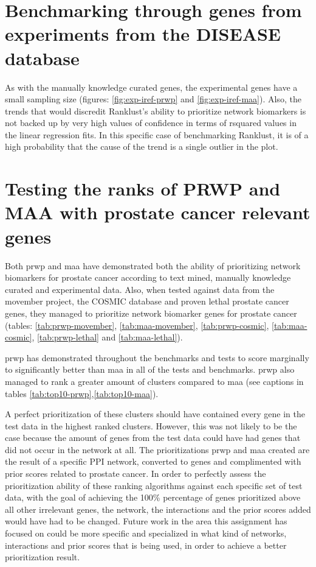 \section{Benchmarking through genes from experiments from the DISEASE database}
As with the manually knowledge curated genes, the experimental genes have
a small sampling size (figures: \ref{fig:exp-iref-prwp} and
\ref{fig:exp-iref-maa}). Also, the trends that would discredit Ranklust's
ability to prioritize network biomarkers is not backed up by very high values of
confidence in terms of \gls{rsquared} values in the linear regression fits. In
this specific case of benchmarking Ranklust, it is of a high probability that
the cause of the trend is a single outlier in the plot.

\section{Testing the ranks of PRWP and MAA with prostate cancer relevant genes}
Both \gls{prwp} and \gls{maa} have demonstrated both the ability of prioritizing
network biomarkers for prostate cancer according to text mined, manually
knowledge curated and experimental data. Also, when tested against data from the
movember project, the COSMIC database and proven lethal prostate cancer genes,
they managed to prioritize network biomarker genes for prostate cancer (tables:
\ref{tab:prwp-movember}, \ref{tab:maa-movember}, \ref{tab:prwp-cosmic},
\ref{tab:maa-cosmic}, \ref{tab:prwp-lethal} and \ref{tab:maa-lethal}).

\gls{prwp} has demonstrated throughout the benchmarks and tests to score
marginally to significantly better than \gls{maa} in all of the tests and
benchmarks. \gls{prwp} also managed to rank a greater amount of clusters
compared to \gls{maa} (see captions in tables
\ref{tab:top10-prwp},\ref{tab:top10-maa}).

A perfect prioritization of these clusters should have contained every gene in
the test data in the highest ranked clusters. However, this was not likely to be
the case because the amount of genes from the test data could have had genes
that did not occur in the network at all. The prioritizations \gls{prwp} and
\gls{maa} created are the result of a specific PPI network, converted to genes
and complimented with prior scores related to prostate cancer. In order to
perfectly assess the prioritization ability of these ranking algorithms against
each specific set of test data, with the goal of achieving the 100\% percentage
of genes prioritized above all other irrelevant genes, the network, the
interactions and the prior scores added would have had to be changed. Future
work in the area this assignment has focused on could be more specific and
specialized in what kind of networks, interactions and prior scores that is
being used, in order to achieve a better prioritization result.

